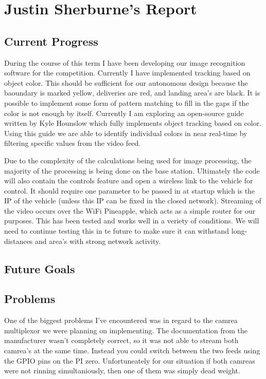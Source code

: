 \documentclass[onecolumn, draftclsnofoot,10pt, compsoc]{IEEEtran}
\begin{document}
\section{Justin Sherburne's Report}

\subsection{Current Progress}

During the course of this term I have been developing our image recognition software for the competition. Currently I have implemented tracking based on object color. This should be sufficient for our autonomous design because the baoundary is marked yellow, deliveries are red, and landing area's are black. It is possible to implement some form of pattern matching to fill in the gaps if the color is not enough by itself. Currently I am exploring an open-source guide written by Kyle Hounslow which fully implements object tracking based on color. Using this guide we are able to identify individual colors in near real-time by filtering specific values from the video feed. 

Due to the complexity of the calculations being used for image processing, the majority of the processing is being done on the base station. Ultimately the code will also contain the controls feature and open a wireless link to the vehicle for control. It should require one parameter to be passed in at startup which is the IP of the vehicle (unless this IP can be fixed in the closed network). Streaming of the video occurs over the WiFi Pineapple, which acts as a simple router for our purposes. This has been tested and works well in a veriety of conditions. We will need to continue testing this in te future to make sure it can withstand long-distances and area's with strong network activity.  


\subsection{Future Goals}



\subsection{Problems}

One of the biggest problems I've encountered was in regard to the camrea multiplexor we were planning on implementing. The documentation from the manufacturer wasn't completely correct, so it was not able to stream both camrea's at the same time. Instead you could switch between the two feeds using the GPIO pins on the PI zero. Unfortuneately for our situation if both camreas were not rinning simultaniously, then one of them was simply dead weight. 
\end{document}
